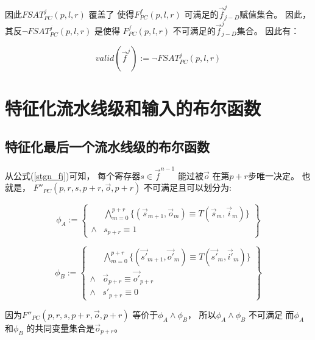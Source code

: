 因此$FSAT^j_{PC}(p,l,r)$ 覆盖了
使得$F^f_{PC}(p,l,r)$ 可满足的$\vec{f}^j_{j-D}$赋值集合。
因此，
其反$\neg FSAT^j_{PC}(p,l,r)$ 是使得
$F^f_{PC}(p,l,r)$ 不可满足的$\vec{f}^j_{j-D}$集合。
因此有：

\begin{equation}
valid(\vec{f}^j):=\neg FSAT^j_{PC}(p,l,r)
\end{equation}





\section{特征化流水线级和输入的布尔函数}\label{sec_char_chap6}
\subsection{特征化最后一个流水线级的布尔函数}

从公式(\ref{stgn_fj})可知，
每个寄存器$s\in \vec{f}^{n-1}$ 能过被$\vec{o}$ 在第$p+r$步唯一决定。
也就是，
$F''_{PC}(p,r,s,p+r,\vec{o},p+r)$ 不可满足且可以划分为:

\begin{equation}
 \phi_A :=
 \left\{
\begin{array}{cc}
&\bigwedge_{m=0}^{p+r}
\{
(\vec{s}_{m+1},\vec{o}_m)\equiv T(\vec{s}_m,\vec{i}_m)
\}
\\
\wedge& s_{p+r}\equiv 1
\end{array}
\right\}
\end{equation}

\begin{equation}
\phi_B :=
\left\{
\begin{array}{cc}
&\bigwedge_{m=0}^{p+r}
\{
(\vec{s'}_{m+1},\vec{o'}_m)\equiv T(\vec{s'}_m,\vec{i'}_m)
\}
\\
\wedge&\vec{o}_{p+r}\equiv \vec{o'}_{p+r} \\
\wedge& s'_{p+r}\equiv 0
\end{array}
\right\}
\end{equation}

因为$F''_{PC}(p,r,s,p+r,\vec{o},p+r)$ 等价于$\phi_A \wedge \phi_B$，
所以$\phi_A \wedge \phi_B$ 不可满足
而$\phi_A$ 和$\phi_B$ 的共同变量集合是$\vec{o}_{p+r}$。

